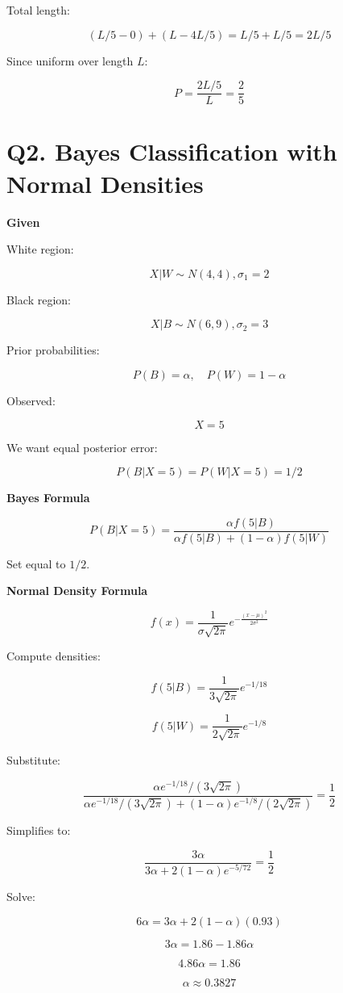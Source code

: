 \documentclass{article}
\begin{document}
Total length:

\[
(L/5 - 0) + (L - 4L/5) = L/5 + L/5 = 2L/5
\]

Since uniform over length $L$:

\[
P = \frac{2L/5}{L} = \frac{2}{5}
\]

\section*{Q2. Bayes Classification with Normal Densities}

\textbf{Given}

White region:

\[
X|W \sim N(4,4), \sigma_1 = 2
\]

Black region:

\[
X|B \sim N(6,9), \sigma_2 = 3
\]

Prior probabilities:

\[
P(B) = \alpha, \quad P(W) = 1-\alpha
\]

Observed:

\[
X = 5
\]

We want equal posterior error:

\[
P(B|X=5) = P(W|X=5) = 1/2
\]

\textbf{Bayes Formula}

\[
P(B|X=5) = \frac{\alpha f(5|B)}{\alpha f(5|B) + (1-\alpha)f(5|W)}
\]

Set equal to $1/2$.

\textbf{Normal Density Formula}

\[
f(x) = \frac{1}{\sigma \sqrt{2\pi}} e^{-\frac{(x-\mu)^2}{2\sigma^2}}
\]

Compute densities:

\[
f(5|B) = \frac{1}{3\sqrt{2\pi}} e^{-1/18}
\]

\[
f(5|W) = \frac{1}{2\sqrt{2\pi}} e^{-1/8}
\]

Substitute:

\[
\frac{\alpha e^{-1/18}/(3\sqrt{2\pi})}
{\alpha e^{-1/18}/(3\sqrt{2\pi}) + (1-\alpha)e^{-1/8}/(2\sqrt{2\pi})}
= \frac{1}{2}
\]

Simplifies to:

\[
\frac{3\alpha}{3\alpha + 2(1-\alpha)e^{-5/72}} = \frac{1}{2}
\]

Solve:

\[
6\alpha = 3\alpha + 2(1-\alpha)(0.93)
\]

\[
3\alpha = 1.86 - 1.86\alpha
\]

\[
4.86\alpha = 1.86
\]

\[
\alpha \approx 0.3827
\]
\end{document}

